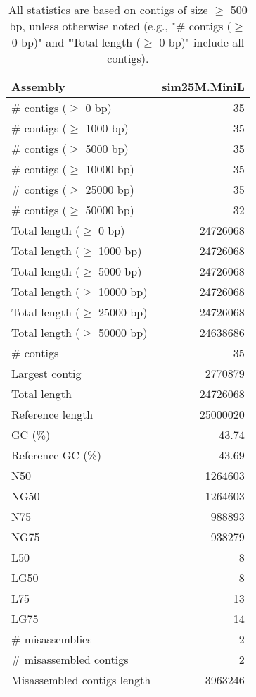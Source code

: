\documentclass[12pt,a4paper]{article}
\begin{document}
\begin{table}[ht]
\begin{center}
\caption{All statistics are based on contigs of size $\geq$ 500 bp, unless otherwise noted (e.g., "\# contigs ($\geq$ 0 bp)" and "Total length ($\geq$ 0 bp)" include all contigs).}
\begin{tabular}{|l*{1}{|r}|}
\hline
Assembly & sim25M.MiniL \\ \hline
\# contigs ($\geq$ 0 bp) & 35 \\ \hline
\# contigs ($\geq$ 1000 bp) & 35 \\ \hline
\# contigs ($\geq$ 5000 bp) & 35 \\ \hline
\# contigs ($\geq$ 10000 bp) & 35 \\ \hline
\# contigs ($\geq$ 25000 bp) & 35 \\ \hline
\# contigs ($\geq$ 50000 bp) & 32 \\ \hline
Total length ($\geq$ 0 bp) & 24726068 \\ \hline
Total length ($\geq$ 1000 bp) & 24726068 \\ \hline
Total length ($\geq$ 5000 bp) & 24726068 \\ \hline
Total length ($\geq$ 10000 bp) & 24726068 \\ \hline
Total length ($\geq$ 25000 bp) & 24726068 \\ \hline
Total length ($\geq$ 50000 bp) & 24638686 \\ \hline
\# contigs & 35 \\ \hline
Largest contig & 2770879 \\ \hline
Total length & 24726068 \\ \hline
Reference length & 25000020 \\ \hline
GC (\%) & 43.74 \\ \hline
Reference GC (\%) & 43.69 \\ \hline
N50 & 1264603 \\ \hline
NG50 & 1264603 \\ \hline
N75 & 988893 \\ \hline
NG75 & 938279 \\ \hline
L50 & 8 \\ \hline
LG50 & 8 \\ \hline
L75 & 13 \\ \hline
LG75 & 14 \\ \hline
\# misassemblies & 2 \\ \hline
\# misassembled contigs & 2 \\ \hline
Misassembled contigs length & 3963246 \\ \hline

\end{tabular}
\end{center}
\end{table}
\end{document}

